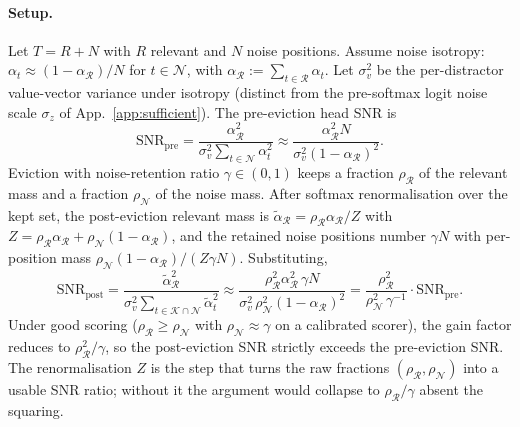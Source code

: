 \documentclass{article}
\begin{document}
\paragraph{Setup.} Let $T = R + N$ with $R$ relevant and $N$ noise positions.
Assume noise isotropy: $\alpha_t \approx (1 - \alpha_{\mathcal{R}}) / N$ for
$t \in \mathcal{N}$, with $\alpha_{\mathcal{R}} := \sum_{t \in \mathcal{R}} \alpha_t$.
Let $\sigma_v^2$ be the per-distractor value-vector variance under isotropy
(distinct from the pre-softmax logit noise scale $\sigma_z$ of
App.~\ref{app:sufficient}). The pre-eviction head SNR is
\[
\mathrm{SNR}_{\mathrm{pre}} = \frac{\alpha_{\mathcal{R}}^2}
{\sigma_v^2 \sum_{t \in \mathcal{N}} \alpha_t^2}
\approx \frac{\alpha_{\mathcal{R}}^2 N}{\sigma_v^2 (1 - \alpha_{\mathcal{R}})^2}.
\]
Eviction with noise-retention ratio $\gamma \in (0, 1)$ keeps a fraction
$\rho_{\mathcal{R}}$ of the relevant mass and a fraction $\rho_{\mathcal{N}}$
of the noise mass. After softmax renormalisation over the kept set, the
post-eviction relevant mass is
$\widetilde{\alpha}_{\mathcal{R}} = \rho_{\mathcal{R}} \alpha_{\mathcal{R}} / Z$
with $Z = \rho_{\mathcal{R}} \alpha_{\mathcal{R}} + \rho_{\mathcal{N}}
(1 - \alpha_{\mathcal{R}})$, and the retained noise positions number
$\gamma N$ with per-position mass $\rho_{\mathcal{N}}(1-\alpha_{\mathcal{R}})/(Z
\gamma N)$. Substituting,
\begin{equation}
\label{eq:scaling-app}
\mathrm{SNR}_{\mathrm{post}}
= \frac{\widetilde{\alpha}_{\mathcal{R}}^2}
{\sigma_v^2 \sum_{t \in \mathcal{K} \cap \mathcal{N}} \widetilde{\alpha}_t^2}
\approx \frac{\rho_{\mathcal{R}}^2 \alpha_{\mathcal{R}}^2 \, \gamma N}
{\sigma_v^2 \, \rho_{\mathcal{N}}^2 (1 - \alpha_{\mathcal{R}})^2}
= \frac{\rho_{\mathcal{R}}^2}{\rho_{\mathcal{N}}^2 \, \gamma^{-1}} \cdot
\mathrm{SNR}_{\mathrm{pre}}.
\end{equation}
Under good scoring ($\rho_{\mathcal{R}} \ge \rho_{\mathcal{N}}$ with
$\rho_{\mathcal{N}} \approx \gamma$ on a calibrated scorer), the gain factor
reduces to $\rho_{\mathcal{R}}^2 / \gamma$, so the post-eviction SNR strictly
exceeds the pre-eviction SNR. The renormalisation $Z$ is the step that turns
the raw fractions $(\rho_{\mathcal{R}}, \rho_{\mathcal{N}})$ into a usable
SNR ratio; without it the argument would collapse to $\rho_{\mathcal{R}}/\gamma$
absent the squaring.
\end{document}
